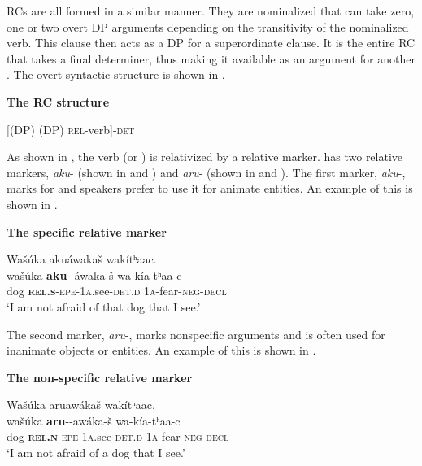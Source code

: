 \documentclass[output=paper]{LSP/langsci}
\begin{document}
 RCs are all formed in a similar manner. They are nominalized  that can take zero, one or two overt DP arguments depending on the transitivity of the nominalized verb. This clause then acts as a DP for a superordinate clause. It is the entire RC that takes a final determiner, thus making it available as an argument for another . The overt syntactic structure is shown in .

\ea \textbf{The  RC structure} \label{boyle6}

[(DP) (DP) \textsc{rel}-verb]-\textsc{det}
\z

As shown in , the verb (or ) is relativized by a relative marker.  has two relative markers, \textit{aku}- (shown in  and ) and \textit{aru}- (shown in  and ). The first marker, \textit{aku}-, marks for  and speakers prefer to use it for animate entities. An example of this is shown in .

\ea \textbf{The  specific relative marker} \label{boyle7}

\glll Wa\v{s}\'uka akuáwaka\v{s} wak\'itʰaac.\\
wa\v{s}\'uka \textbf{aku}--áwaka-\v{s}  wa-k\'ia-tʰaa-c\\
dog \textbf{\textsc{rel.s}}-\textsc{epe}-\textsc{1a}.see-\textsc{det.d} \textsc{1a}-fear-\textsc{neg-decl}\\
\trans `I am not afraid of that dog that I see.' 
\z

The second marker, \textit{aru}-, marks nonspecific arguments and is often used for inanimate objects or entities. An example of this is shown in .

\ea \textbf{The  non-specific relative marker} \label{boyle8}

\glll Wa\v{s}\'uka aruawáka\v{s} wak\'itʰaac.\\
wa\v{s}\'uka \textbf{aru}--awáka-\v{s}  wa-k\'ia-tʰaa-c\\
dog \textbf{\textsc{rel.n}}-\textsc{epe}-\textsc{1a}.see-\textsc{det.d} \textsc{1a}-fear-\textsc{neg-decl}\\
\trans `I am not afraid of a dog that I see.' 
\z
\end{document}

